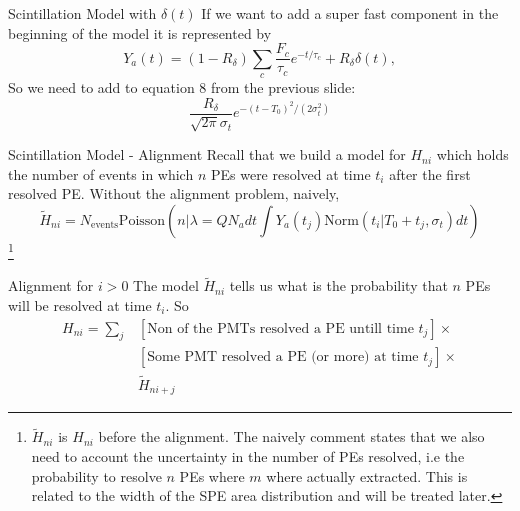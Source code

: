 \documentclass{beamer}
\newcommand\blfootnote[1]{%
  \begingroup
  \renewcommand\thefootnote{}\footnote{#1}%
  \addtocounter{footnote}{-1}%
  \endgroup
}
\begin{document}
\begin{frame}{Scintillation Model with $\delta(t)$}
If we want to add a super fast component in the beginning of the model it is represented by
\begin{equation}
Y_a(t)=(1-R_\delta)\sum_c\frac{F_c}{\tau_c}e^{-t/\tau_c}+R_\delta\delta(t),
\end{equation}
So we need to add to equation 8 from the previous slide:
\begin{equation}
\frac{R_\delta}{\sqrt{2\pi}\sigma_t}e^{-(t-T_0)^2/(2\sigma_t^2)}
\end{equation}
\end{frame}

\begin{frame}{Scintillation Model - Alignment}
Recall that we build a model for $H_{ni}$ which holds the number of events in which $n$ PEs were resolved at time $t_i$ after the first resolved PE.
Without the alignment problem, naively, 
\begin{equation}
\tilde{H}_{ni}=N_{\text{events}}\text{Poisson}\left(n\bigg|\lambda=QN_adt\int Y_a(t_j)\text{Norm}(t_i|T_0+t_j, \sigma_t)dt\right)
\end{equation}
\blfootnote{$\tilde{H}_{ni}$ is $H_{ni}$ before the alignment. The naively comment states that we also need to account the uncertainty in the number of PEs resolved, i.e the probability to resolve $n$ PEs where $m$ where actually extracted. This is related to the width of the SPE area distribution  and will be treated later.}
\end{frame}

\begin{frame}{Alignment for $i>0$}
The model $\tilde{H}_{ni}$ tells us what is the probability that $n$ PEs will be resolved at time $t_i$. So 
\begin{equation}
\begin{split}
H_{ni}=\sum_j&[\text{Non of the PMTs resolved a PE untill time }t_j]\times\\
&[\text{Some PMT resolved a PE (or more) at time }t_j]\times\\
&\tilde{H}_{ni+j}
\end{split}
\end{equation}
\end{frame}
\end{document}
